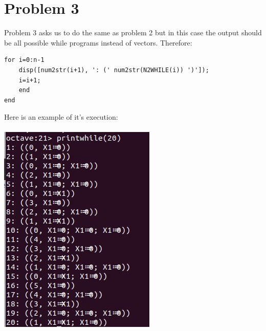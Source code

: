 \documentclass{article}
\begin{document}
\section*{Problem 3}
Problem 3 asks us to do the same as problem 2 but in this case the output should be all possible while programs instead of vectors. Therefore:
\begin{lstlisting}
for i=0:n-1
	disp([num2str(i+1), ': (' num2str(N2WHILE(i)) ')']);
	i=i+1;
	end
end
\end{lstlisting} 
Here is an example of it's execution: \\\\ 
\includegraphics[width=\linewidth]{printwhile.png}
\end{document}
